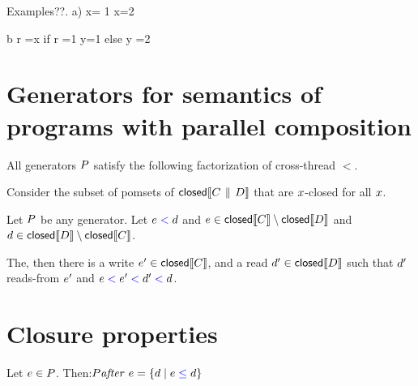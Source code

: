 Examples??.  
a) x= 1
x=2

b  r =x
   if r =1  {y=1}
   else      {y =2}

\section{Generators for semantics of programs with parallel composition}
All generators $P$  satisfy the following factorization of cross-thread $\lt$.  

\begin{lemma}\label{pargen}
Consider the subset of pomsets of $\textsf{closed}\llbracket C \,\mathbin{\|}\, D\rrbracket$ that are  $x$-closed for all $x$.  

Let $P$  be any generator.  Let $e\mathrel{{\color{blue}<}}d$ and $e \in \textsf{closed}\llbracket C\rrbracket \setminus \textsf{closed}\llbracket D\rrbracket$ and  $d \in \textsf{closed}\llbracket D\rrbracket \setminus \textsf{closed}\llbracket C\rrbracket$.  

The,  then there is a write  $e' \in \textsf{closed}\llbracket C\rrbracket$, and  a read $d' \in \textsf{closed}\llbracket D\rrbracket$ such that  $d'$ reads-from $e'$ and $e \mathrel{{\color{blue}<}} e' \mathrel{{\color{blue}<}} d' \mathrel{{\color{blue}<}} d$. 



\end{lemma}

\section{Closure properties}

\begin{definition}
Let $e \in P$.  Then:$ P \mathit{after}\ e = \{ d \mid e \mathrel{{\color{blue}\leq}} d \}$
\end{definition}


